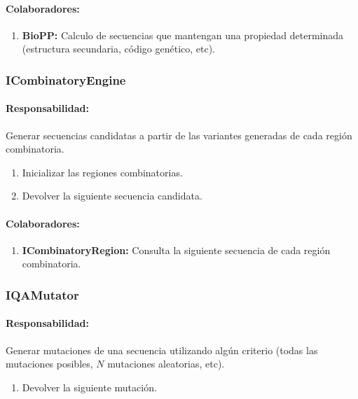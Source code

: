     \paragraph{Colaboradores:}
      \begin{enumerate}
       \item \textbf{BioPP:} Calculo de secuencias que mantengan una propiedad
determinada (estructura secundaria, c\'odigo gen\'etico, etc).
      \end{enumerate}

  \subsubsection{ICombinatoryEngine}
    \paragraph{Responsabilidad:} Generar secuencias candidatas a partir de las
variantes generadas de cada regi\'on combinatoria.       
      \begin{enumerate}       
       \item Inicializar las regiones combinatorias.
       \item Devolver la siguiente secuencia candidata.
      \end{enumerate}
    \paragraph{Colaboradores:}
      \begin{enumerate}
       \item \textbf{ICombinatoryRegion:} Consulta la siguiente secuencia de
cada regi\'on combinatoria.
      \end{enumerate}

  \subsubsection{IQAMutator}
    \paragraph{Responsabilidad:} Generar mutaciones de una secuencia
utilizando alg\'un criterio (todas las mutaciones posibles, $N$
mutaciones aleatorias, etc).
      \begin{enumerate}
       \item Devolver la siguiente mutaci\'on.
      \end{enumerate}    

